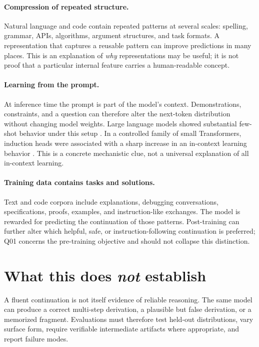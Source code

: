 \documentclass[11pt]{article}
\begin{document}
\paragraph{Compression of repeated structure.} Natural language and code contain repeated patterns at several scales: spelling, grammar, APIs, algorithms, argument structures, and task formats. A representation that captures a reusable pattern can improve predictions in many places. This is an explanation of \emph{why} representations may be useful; it is not proof that a particular internal feature carries a human-readable concept.

\paragraph{Learning from the prompt.} At inference time the prompt is part of the model's context. Demonstrations, constraints, and a question can therefore alter the next-token distribution without changing model weights. Large language models showed substantial few-shot behavior under this setup \cite{brown2020language}. In a controlled family of small Transformers, induction heads were associated with a sharp increase in an in-context learning behavior \cite{olsson2022induction}. This is a concrete mechanistic clue, not a universal explanation of all in-context learning.

\paragraph{Training data contains tasks and solutions.} Text and code corpora include explanations, debugging conversations, specifications, proofs, examples, and instruction-like exchanges. The model is rewarded for predicting the continuation of those patterns. Post-training can further alter which helpful, safe, or instruction-following continuation is preferred; Q01 concerns the pre-training objective and should not collapse this distinction.

\section{What this does \emph{not} establish}
A fluent continuation is not itself evidence of reliable reasoning. The same model can produce a correct multi-step derivation, a plausible but false derivation, or a memorized fragment. Evaluations must therefore test held-out distributions, vary surface form, require verifiable intermediate artifacts where appropriate, and report failure modes.
\end{document}

